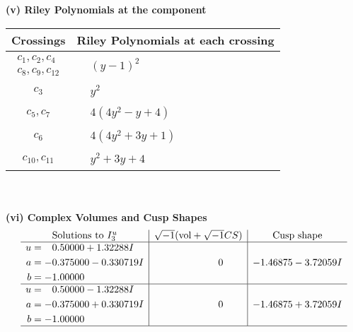 \documentclass[1p]{elsarticle_modified}
\theoremstyle{definition}
\newcommand{\I}{\sqrt{-1}}
\begin{document}
\newpage\renewcommand{\arraystretch}{1}
\flushleft \textbf{(v) Riley Polynomials at the component}\newline \\
\begin{tabular}{m{50pt}|m{274pt}}
Crossings & \hspace{64pt}Riley Polynomials at each crossing \\
\hline $$\begin{aligned}c_{1},c_{2},c_{4}\\c_{8},c_{9},c_{12}\end{aligned}$$&$\begin{aligned}
&(y-1)^2
\end{aligned}$\\
\hline $$\begin{aligned}c_{3}\end{aligned}$$&$\begin{aligned}
&y^2
\end{aligned}$\\
\hline $$\begin{aligned}c_{5},c_{7}\end{aligned}$$&$\begin{aligned}
&4(4 y^2- y+4)
\end{aligned}$\\
\hline $$\begin{aligned}c_{6}\end{aligned}$$&$\begin{aligned}
&4(4 y^2+3 y+1)
\end{aligned}$\\
\hline $$\begin{aligned}c_{10},c_{11}\end{aligned}$$&$\begin{aligned}
&y^2+3 y+4
\end{aligned}$\\
\hline
\end{tabular}\\~\\
\newpage\flushleft \textbf{(vi) Complex Volumes and Cusp Shapes}
$$\begin{array}{c|c|c}  
\text{Solutions to }I^u_{3}& \I (\text{vol} + \sqrt{-1}CS) & \text{Cusp shape}\\
 \hline 
\begin{aligned}
u &= \phantom{-}0.50000 + 1.32288 I \\
a &= -0.375000 - 0.330719 I \\
b &= -1.00000\phantom{ +0.000000I}\end{aligned}
 & \phantom{-0.000000 } 0 & -1.46875 - 3.72059 I \\ \hline\begin{aligned}
u &= \phantom{-}0.50000 - 1.32288 I \\
a &= -0.375000 + 0.330719 I \\
b &= -1.00000\phantom{ +0.000000I}\end{aligned}
 & \phantom{-0.000000 } 0 & -1.46875 + 3.72059 I\\
 \hline 
 \end{array}$$\newpage
\end{document}

